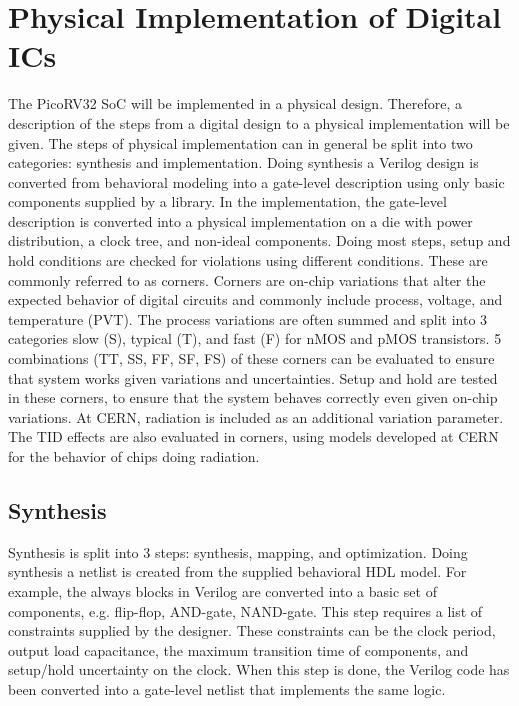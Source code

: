 \section{Physical Implementation of Digital ICs}
\label{phys_imp_theory}

The PicoRV32 SoC will be implemented in a physical design. Therefore, a description of the steps from a digital design to a physical implementation will be given. The steps of physical implementation can in general be split into two categories: synthesis and implementation. Doing synthesis a Verilog design is converted from behavioral modeling into a gate-level description using only basic components supplied by a library. In the implementation, the gate-level description is converted into a physical implementation on a die with power distribution, a clock tree, and non-ideal components. Doing most steps, setup and hold conditions are checked for violations using different conditions. These are commonly referred to as corners. Corners are on-chip variations that alter the expected behavior of digital circuits and commonly include process, voltage, and temperature (PVT). The process variations are often summed and split into 3 categories slow (S), typical (T), and fast (F) for nMOS and pMOS transistors. 5 combinations (TT, SS, FF, SF, FS) of these corners can be evaluated to ensure that system works given variations and uncertainties. Setup and hold are tested in these corners, to ensure that the system behaves correctly even given on-chip variations. At CERN, radiation is included as an additional variation parameter. The TID effects are also evaluated in corners, using models developed at CERN for the behavior of chips doing radiation.

\subsection{Synthesis}
Synthesis is split into 3 steps: synthesis, mapping, and optimization. Doing synthesis a netlist is created from the supplied behavioral HDL model. For example, the always blocks in Verilog are converted into a basic set of components, e.g. flip-flop, AND-gate, NAND-gate. This step requires a list of constraints supplied by the designer. These constraints can be the clock period, output load capacitance, the maximum transition time of components, and setup/hold uncertainty on the clock. When this step is done, the Verilog code has been converted into a gate-level netlist that implements the same logic. 

